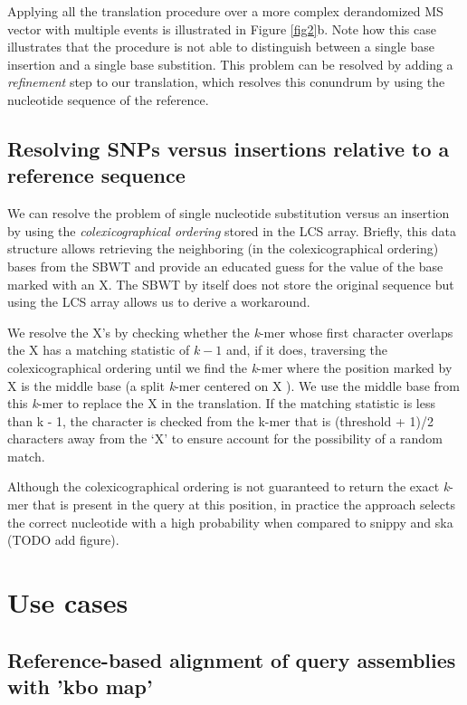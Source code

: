 \documentclass[unnumsec,webpdf,contemporary,large]{oup-authoring-template}%
\theoremstyle{thmstyleone}%
\theoremstyle{thmstyletwo}%
\theoremstyle{thmstylethree}%
\begin{document}
Applying all the translation procedure over a more complex derandomized MS vector with multiple events is illustrated in Figure \ref{fig2}b. Note how this case illustrates that the procedure is not able to distinguish between a single base insertion and a single base substition. This problem can be resolved by adding a \textit{refinement} step to our translation, which resolves this conundrum by using the nucleotide sequence of the reference.

\subsection{Resolving SNPs versus insertions relative to a reference sequence}
We can resolve the problem of single nucleotide substitution versus an insertion by using the \textit{colexicographical ordering} stored in the LCS array\cite{alanko2023longest}. Briefly, this data structure allows retrieving the neighboring (in the colexicographical ordering) bases from the SBWT and provide an educated guess for the value of the base marked with an X. The SBWT by itself does not store the original sequence but using the LCS array allows us to derive a workaround.

We resolve the X's by checking whether the \emph{k}-mer whose first character overlaps the X has a matching statistic of $k - 1$ and, if it does, traversing the colexicographical ordering until we find the \emph{k}-mer where the position marked by X is the middle base (a split \emph{k}-mer centered on X \cite{derelle2024seamless}). We use the middle base from this \emph{k}-mer to replace the X in the translation. If the matching statistic is less than k - 1, the character is checked from the k-mer that is (threshold + 1)/2 characters away from the ‘X’ to ensure account for the possibility of a random match.

Although the colexicographical ordering is not guaranteed to return the exact \emph{k}-mer that is present in the query at this position, in practice the approach selects the correct nucleotide with a high probability when compared to snippy and ska (TODO add figure).

\section{Use cases}

\subsection{Reference-based alignment of query assemblies with 'kbo map'}
\end{document}
